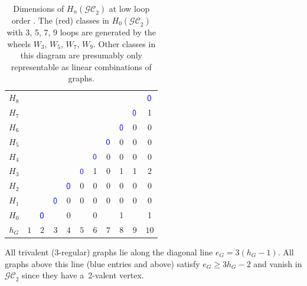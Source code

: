 \documentclass[pdftex]{sigma}%
\numberwithin{equation}{section}
\newcommand{\GC}{\mathcal{GC}}
\newcommand{\0}{\color{blue}{\mathsf{0}}}
\begin{document}
\begin{table}[h]
\caption{Dimensions of $H_n(\GC_2)$ at low loop order \cite{GraphComplexComputations}. The (red) classes in $H_0(\GC_2)$ with 3, 5, 7, 9 loops are generated by the wheels $W_3$, $W_5$, $W_7$, $W_9$. Other classes in this diagram are presumably only representable as linear combinations of graphs.}
\label{table:knownresults}
\begin{center}
\begin{tabular}{c|cccccccccc}
$H_8$ &&&&&&&&&& $\0$ \\
$H_7$ &&&&&&&&& $\0$& 1 \\
$H_6$ &&&&&&&& $\0$ & 0& 0 \\
$H_5$ &&&&&&& $\0$ & 0 & 0& 0 \\
$H_4$ &&&&&& $\0$ & 0 & 0& 0 &0\\
$H_3$ &&&&& $\0$ & 1 & 0& 1 &1 & 2 \\
$H_2$ &&&& $\0$ & 0&0 & 0 & 0 & 0 & 0 \\
$H_1$ &&& $\0$ & 0 & 0 & 0 & 0 & 0 & 0 & 0 \\
$H_0$ && $\0$ & \color{red}{1} & 0&\color{red}{1} &0 & \color{red}{1} & 1& \color{red}{1} & 1 \\
\hline
$h_G$ & $1$ & $2$ & $3$ & $4$ & $5$ & $6$ & $7$ & $8$& $9$& $10$
\end{tabular}
\end{center}
\end{table}
All trivalent (3-regular) graphs lie along the diagonal line $e_G = 3(h_G-1)$. All graphs above this line (blue entries and above) satisfy $e_G \geq 3h_G-2$ and vanish in $\GC_2$ since they have a~2-valent vertex.
\medskip
\end{document}
